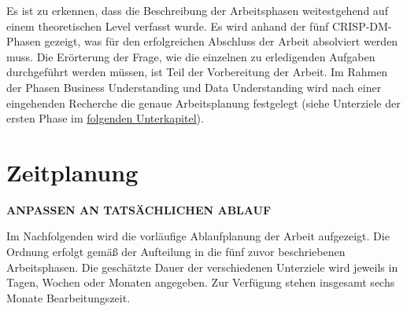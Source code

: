 Es ist zu erkennen, dass die Beschreibung der Arbeitsphasen weitestgehend auf einem theoretischen Level verfasst wurde. Es wird anhand der fünf CRISP-DM-Phasen gezeigt, was für den erfolgreichen Abschluss der Arbeit absolviert werden muss. Die Erörterung der Frage, wie die einzelnen zu erledigenden Aufgaben durchgeführt werden müssen, ist Teil der Vorbereitung der Arbeit. Im Rahmen der Phasen Business Understanding und Data Understanding wird nach einer eingehenden Recherche die genaue Arbeitsplanung festgelegt (siehe Unterziele der ersten Phase im \hyperref[timecourse] {folgenden Unterkapitel}).  

\section{Zeitplanung}
\label{timecourse}

\textbf{ANPASSEN AN TATSÄCHLICHEN ABLAUF}

Im Nachfolgenden wird die vorläufige Ablaufplanung der Arbeit aufgezeigt. Die Ordnung erfolgt gemäß der Aufteilung in die fünf zuvor beschriebenen Arbeitsphasen. Die geschätzte Dauer der verschiedenen Unterziele wird jeweils in Tagen, Wochen oder Monaten angegeben. Zur Verfügung stehen insgesamt sechs Monate Bearbeitungszeit.

